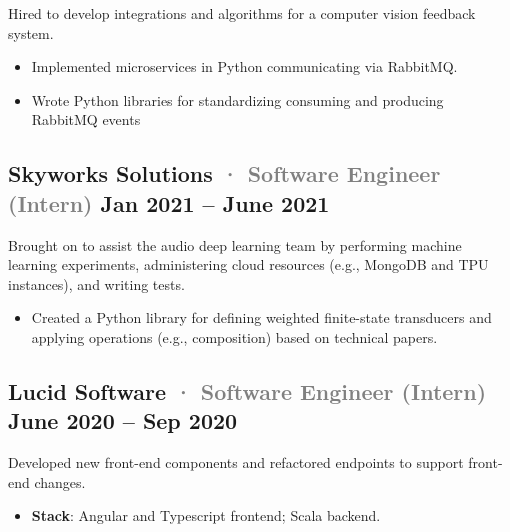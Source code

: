 \documentclass[10pt]{article} %
\providecommand{\tightlist}{%
  \setlength{\itemsep}{0pt}\setlength{\parskip}{0pt}}
\renewcommand{\emph}[1]{%
  \textcolor{gray}{#1}%
}
\begin{document}
\begin{paracol}{2}
Hired to develop integrations and algorithms for a computer vision
feedback system.

\begin{itemize}
\tightlist
\item
  Implemented microservices in Python communicating via RabbitMQ.
\item
  Wrote Python libraries for standardizing consuming and producing
  RabbitMQ events
\end{itemize}

\hypertarget{skyworks-solutions-software-engineer-intern-jan-2021-june-2021}{%
\subsection{\texorpdfstring{Skyworks Solutions \emph{· \small Software
Engineer (Intern)} \hfill \small Jan 2021 -- June
2021}{Skyworks Solutions · Software Engineer (Intern) Jan 2021 -- June 2021}}\label{skyworks-solutions-software-engineer-intern-jan-2021-june-2021}}

Brought on to assist the audio deep learning team by performing machine
learning experiments, administering cloud resources (e.g., MongoDB and
TPU instances), and writing tests.

\begin{itemize}
\tightlist
\item
  Created a Python library for defining weighted finite-state
  transducers and applying operations (e.g., composition) based on
  technical papers.
\end{itemize}

\hypertarget{lucid-software-software-engineer-intern-june-2020-sep-2020}{%
\subsection{\texorpdfstring{Lucid Software \emph{· \small Software
Engineer (Intern)} \hfill \small June 2020 -- Sep
2020}{Lucid Software · Software Engineer (Intern) June 2020 -- Sep 2020}}\label{lucid-software-software-engineer-intern-june-2020-sep-2020}}

Developed new front-end components and refactored endpoints to support
front-end changes.

\begin{itemize}
\tightlist
\item
  \textbf{Stack}: Angular and Typescript frontend; Scala backend.
\end{itemize}

\hypertarget{cbt-nuggets-software-engineer-intern-june-2018-june-2019}{%
}
\end{paracol}
\end{document}
